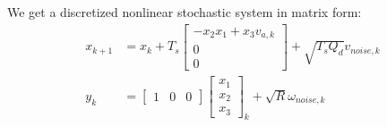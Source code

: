\documentclass[12pt,a4paper]{article}
\begin{document}
	We get a discretized nonlinear stochastic system in matrix form:
	\begin{equation}
		\boxed{\begin{split}
				x_{k+1} &= x_k + T_s
				\begin{bmatrix}
					-x_2 x_1 + x_3 v_{a,k} \\
					0                      \\
					0                      
				\end{bmatrix} +\sqrt{T_s Q_d}v_{noise,k}\\
				y_k &= 
				\begin{bmatrix}
					1 & 0 & 0 
				\end{bmatrix}
				\begin{bmatrix}
					x_1 \\
					x_2 \\
					x_3 
				\end{bmatrix}_k+\sqrt{R}\omega_{noise,k}
		\end{split}}
		\label{eq7}
	\end{equation}
\end{document}
